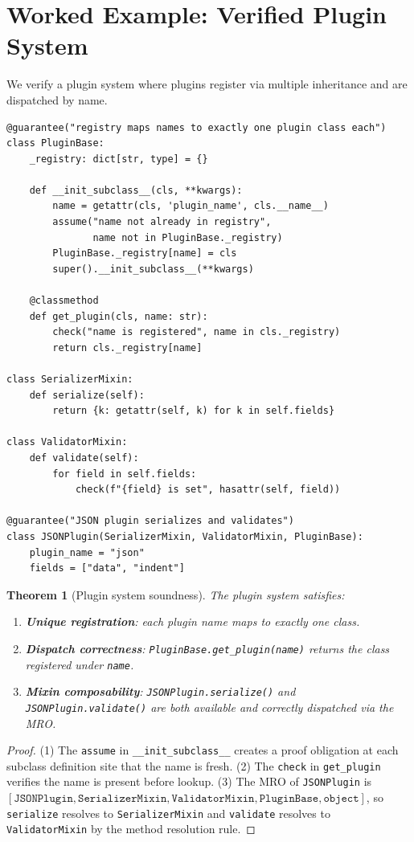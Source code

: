 \documentclass[11pt,a4paper]{report}
\theoremstyle{definition}
\theoremstyle{plain}
\newtheorem{theorem}[definition]{Theorem}
\begin{document}
\section{Worked Example: Verified Plugin System}

We verify a plugin system where plugins register via multiple inheritance
and are dispatched by name.

\begin{lstlisting}[style=synhopy]
@guarantee("registry maps names to exactly one plugin class each")
class PluginBase:
    _registry: dict[str, type] = {}

    def __init_subclass__(cls, **kwargs):
        name = getattr(cls, 'plugin_name', cls.__name__)
        assume("name not already in registry",
               name not in PluginBase._registry)
        PluginBase._registry[name] = cls
        super().__init_subclass__(**kwargs)

    @classmethod
    def get_plugin(cls, name: str):
        check("name is registered", name in cls._registry)
        return cls._registry[name]

class SerializerMixin:
    def serialize(self):
        return {k: getattr(self, k) for k in self.fields}

class ValidatorMixin:
    def validate(self):
        for field in self.fields:
            check(f"{field} is set", hasattr(self, field))

@guarantee("JSON plugin serializes and validates")
class JSONPlugin(SerializerMixin, ValidatorMixin, PluginBase):
    plugin_name = "json"
    fields = ["data", "indent"]
\end{lstlisting}

\begin{theorem}[Plugin system soundness]
\label{thm:plugin-system}
The plugin system satisfies:
\begin{enumerate}
  \item \textbf{Unique registration}: each plugin name maps to exactly one class.
  \item \textbf{Dispatch correctness}:
    \lstinline[style=python]{PluginBase.get_plugin(name)} returns the class
    registered under \texttt{name}.
  \item \textbf{Mixin composability}: \texttt{JSONPlugin.serialize()} and
    \texttt{JSONPlugin.validate()} are both available and correctly
    dispatched via the MRO.
\end{enumerate}
\end{theorem}
\begin{proof}
(1) The \lstinline[style=python]{assume} in
\lstinline[style=python]{__init_subclass__} creates a proof obligation at each
subclass definition site that the name is fresh.
(2) The \lstinline[style=python]{check} in \texttt{get\_plugin} verifies
the name is present before lookup.
(3) The MRO of \texttt{JSONPlugin} is
$[\texttt{JSONPlugin}, \texttt{SerializerMixin}, \texttt{ValidatorMixin},
  \texttt{PluginBase}, \texttt{object}]$,
so \texttt{serialize} resolves to \texttt{SerializerMixin} and
\texttt{validate} resolves to \texttt{ValidatorMixin} by the method
resolution rule.
\end{proof}
\end{document}
